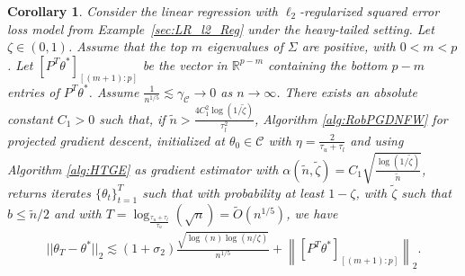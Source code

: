 \documentclass{article}
\newtheorem{corollary}{Corollary}
\begin{document}
\begin{corollary}
\label{corollary:HT_Ridge_min=0}
Consider the linear regression with $\ell_2$-regularized squared error loss model from Example~\ref{sec:LR_l2_Reg} under the heavy-tailed setting. Let $\zeta \in (0, 1)$. Assume that the top $m$ eigenvalues of $\Sigma$ are positive, with $0 < m < p$. Let $[P^T\theta^*]_{[(m + 1):p]}$ be the vector in $\mathbb{R}^{p - m}$ containing the bottom $p - m$ entries of $P^T\theta^*$. Assume $\frac{1}{n^{1/5}} \lesssim \gamma_{\mathcal{C}} \rightarrow 0$ as $n \rightarrow \infty$. There exists an absolute constant $C_1 > 0$ such that, if $\widetilde{n} > \frac{4C_1^2\log(1/\widetilde{\zeta})}{\tau_l^2}$, Algorithm \ref{alg:RobPGDNFW} for projected gradient descent, initialized at $\theta_0 \in \mathcal{C}$ with $\eta = \frac{2}{\tau_u + \tau_l}$ and using Algorithm \ref{alg:HTGE} as gradient estimator with $\alpha(\widetilde{n}, \widetilde{\zeta}) = C_1\sqrt{\frac{\log(1/\widetilde{\zeta})}{\widetilde{n}}}$, returns iterates $\{\theta_t\}_{t = 1}^T$ such that with probability at least $1 - \zeta$, with $\widetilde{\zeta}$ such that $b \leq \widetilde{n}/2$ and with $T = \log_{\frac{\tau_u + \tau_l}{\tau_u}}(\sqrt{n}) = \widetilde{O}\left(n^{1/5}\right)$, we have
\begin{align*}
||\theta_T - \theta^*||_2 \lesssim (1 + \sigma_2)\frac{\sqrt{\log(n)\log\left(n/\zeta\right)}}{n^{1/5}} + \left\|[P^T\theta^*]_{[(m+1):p]}\right\|_2.
\end{align*}
\end{corollary}
\end{document}
